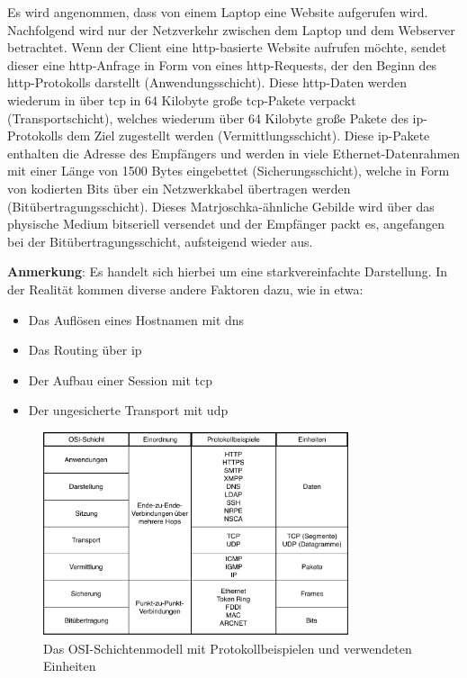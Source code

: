 \documentclass[titlepage]{report}
\begin{document}
Es wird angenommen, dass von einem Laptop eine Website aufgerufen wird.
Nachfolgend wird nur der Netzverkehr zwischen dem Laptop und dem
Webserver
betrachtet. Wenn der Client eine \gls{http}\hyp{}basierte Website
aufrufen möchte, sendet dieser eine \gls{http}\hyp{}Anfrage in Form von
eines
\gls{http}\hyp{}Requests, der den Beginn des \gls{http}\hyp{}Protokolls
darstellt (Anwendungsschicht). Diese \gls{http}\hyp{}Daten
werden wiederum in über \gls{tcp} in 64 Kilobyte große
\gls{tcp}\hyp{}Pakete verpackt (Transportschicht),
welches wiederum über 64 Kilobyte große Pakete des
\gls{ip}\hyp{}Protokolls dem Ziel zugestellt werden
(Vermittlungsschicht). Diese \gls{ip}\hyp{}Pakete enthalten die Adresse
des Empfängers und werden in viele Ethernet-Datenrahmen mit einer Länge
von 1500 Bytes eingebettet (Sicherungsschicht), welche in Form von
kodierten Bits über ein Netzwerkkabel übertragen werden (Bitübertragungsschicht).
Dieses Matrjoschka\hyp{}ähnliche Gebilde wird über das physische
Medium bitseriell versendet und der Empfänger packt es, angefangen bei der
Bitübertragungsschicht, aufsteigend wieder aus.

\textbf{Anmerkung}: Es handelt sich hierbei um eine starkvereinfachte
Darstellung. In der Realität kommen diverse andere Faktoren dazu, wie in
etwa:
\begin{itemize}
    \item Das Auflösen eines Hostnamen mit \gls{dns}
    \item Das Routing über \gls{ip}
    \item Der Aufbau einer Session mit \gls{tcp}
    \item Der ungesicherte Transport mit \gls{udp}
\end{itemize}
\begin{figure}[H]
    \centering
    \includegraphics[width=0.8\textwidth]{figures/osi.pdf}
    \caption{Das OSI-Schichtenmodell mit Protokollbeispielen und
    verwendeten Einheiten}\label{fig:osi}
\end{figure}
\end{document}
